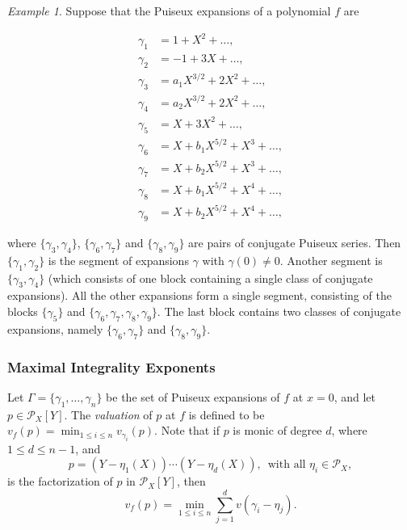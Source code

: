 \documentclass[a4paper,11pt]{amsart}%
\theoremstyle{definition}
\theoremstyle{plain}
\theoremstyle{remark}
\newtheorem{example}[defn]{Example}
\begin{document}
\begin{example}
\label{examplePuiseux2} Suppose that the Puiseux expansions of a polynomial
$f$ are \begin{multicols}{2}
\noindent
\begin{align*}
\gamma_1 &= 1 + X^2 + \dots, \\
\gamma_2 &= -1 + 3X + \dots, \\
\gamma_3 &= a_1 X^{3/2} + 2X^2 + \dots, \\
\gamma_4 &= a_2 X^{3/2} + 2X^2 + \dots, \\
\gamma_5 &= X + 3 X^2 + \dots, \\
\gamma_6 &= X + b_1 X^{5/2} + X^3 + \dots, \\
\gamma_7 &= X + b_2 X^{5/2} + X^3 + \dots, \\
\gamma_8 &= X + b_1 X^{5/2} + X^{4} + \dots, \\
\gamma_9 &= X + b_2 X^{5/2} + X^{4} + \dots,
\end{align*}
\end{multicols}
\noindent where $\{\gamma_{3}, \gamma_{4}\}$, $\{\gamma_{6}, \gamma_{7}\}$ and
$\{\gamma_{8}, \gamma_{9}\}$ are pairs of conjugate Puiseux series. Then
$\{\gamma_{1}, \gamma_{2}\}$ is the segment of expansions $\gamma$ with
$\gamma\left(  0\right)  \not =0$. Another segment is $\{\gamma_{3},
\gamma_{4}\}$ (which consists of one block containing a single class of
conjugate expansions). All the other expansions form a single segment,
consisting of the blocks $\{\gamma_{5}\}$ and $\{\gamma_{6}, \gamma_{7},
\gamma_{8}, \gamma_{9}\}$. The last block contains two classes of conjugate
expansions, namely $\{\gamma_{6}, \gamma_{7}\}$ and $\{\gamma_{8}, \gamma
_{9}\}$.
\end{example}

\subsubsection*{Maximal Integrality Exponents}

\label{sect:max-expo} 

Let $\varGamma = \{\gamma_{1},\dots,\gamma_{n}\}$ be the set of Puiseux
expansions of $f$ at $x = 0$, and let $p\in{\mathcal{P}_{X}}[Y]$. The
{\emph{valuation}} of $p$ at $f$ is defined to be $v_{f}(p)=\min_{1 \leq i
\leq n} v_{\gamma_{i}}(p)$. Note that if $p$ is monic of degree $d$, where
$1\leq d \leq n-1$, and
\[
p=(Y-\eta_{1}(X))\cdots(Y-\eta_{d}(X))\mbox{, } \text{ with all }\eta_{i}
\in{\mathcal{P}_{X}},
\]
is the factorization of $p$ in ${\mathcal{P}_{X}}[Y]$, then 
\[
v_{f}(p)=\min_{1 \leq i \leq n}\sum_{j=1}^{d}v(\gamma_{i}-\eta_{j})\text{.}%
\]
\end{document}
